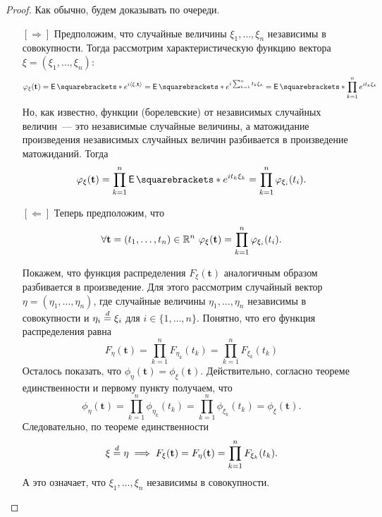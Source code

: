 \begin{proof}
	Как обычно, будем доказывать по очереди.
	\begin{itemize}
		\item[{\([\Rightarrow]\)}] Предположим, что случайные величины 
		\(\xi_{1}, \dots, \xi_{n}\) независимы в совокупности. Тогда рассмотрим 
		характеристическую функцию вектора \(\xi = (\xi_1, \dots, \xi_n)\):
		\[
			\phi_{\xi}(\mathbf{t}) = \E{e^{i\left\langle\xi, 
			\mathbf{t}\right\rangle}} = \E{e^{i\sum_{k = 1}^{n} t_k\xi_k}} = 
			\E{\prod_{k = 1}^{n} e^{it_k\xi_{k}}}
		\]
		Но, как известно, функции (борелевские) от независимых случайных 
		величин~--- это независимые случайные величины, а матожидание 
		произведения независимых случайных величин разбивается в произведение 
		матожиданий. Тогда
		\[
			\phi_{\xi}(\mathbf{t}) = \prod_{k = 1}^{n} \E{e^{it_k\xi_{k}}} = 
			\prod_{k = 1}^{n} \phi_{\xi_i}(t_i).
		\]
		
		\item[{\([\Leftarrow]\)}] Теперь предположим, что
		\[
			\forall \mathbf{t} = (t_1, \dots, t_n) \in \R^n\ 
			\phi_{\xi}(\mathbf{t}) = \prod_{k = 1}^{n} \phi_{\xi_i}(t_i).
		\]
		
		Покажем, что функция распределения \(F_{\xi}(\mathbf{t})\) аналогичным 
		образом разбивается в произведение. Для этого рассмотрим случайный 
		вектор \(\eta = (\eta_1, \dots, \eta_n)\), где случайные величины 
		\(\eta_1, \dots, \eta_n\) независимы в совокупности и \(\eta_{i} 
		\overset{d}{=} \xi_{i}\) для \(i \in \{1, \dots, n\}\). Понятно, что его 
		функция распределения равна
		\[
			F_{\eta}(\mathbf{t}) = \prod_{k = 1}^{n} F_{\eta_k}(t_k) = \prod_{k 
			= 1}^{n} F_{\xi_k}(t_k)
		\]
		Осталось показать, что \(\phi_{\eta}(\mathbf{t}) = 
		\phi_{\xi}(\mathbf{t})\). Действительно, согласно теореме 
		единственности и первому пункту получаем, что
		\[
			\phi_{\eta}(\mathbf{t}) = \prod_{k = 1}^{n} \phi_{\eta_k}(t_k) = 
			\prod_{k = 1}^{n} \phi_{\xi_k}(t_k) = \phi_{\xi}(\mathbf{t}).
		\]
		Следовательно, по теореме единственности
		\[
			\xi \overset{d}{=} \eta \implies F_{\xi}(\mathbf{t}) = 
			F_{\eta}(\mathbf{t}) = \prod_{k = 1}^{n} F_{\xi_k}(t_k).
		\]
		А это означает, что \(\xi_{1}, \dots, \xi_{n}\) независимы в 
		совокупности.
	\end{itemize}
\end{proof}

